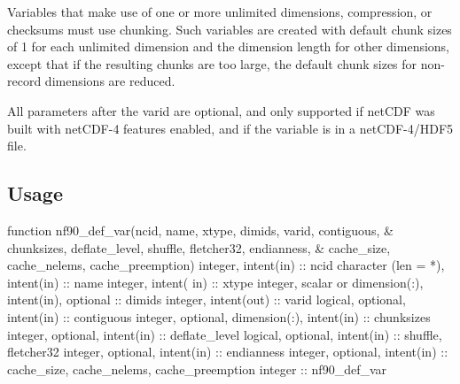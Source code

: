 Variables that make use of one or more unlimited dimensions, compression, or checksums must use chunking. Such variables are created with default chunk sizes of 1 for each unlimited dimension and the dimension length for other dimensions, except that if the resulting chunks are too large, the default chunk sizes for non-\/record dimensions are reduced.

All parameters after the varid are optional, and only supported if net\+C\+DF was built with net\+C\+D\+F-\/4 features enabled, and if the variable is in a net\+C\+D\+F-\/4/\+H\+D\+F5 file.

\subsection*{Usage}


\begin{DoxyCode}
\textcolor{keyword}{function }nf90\_def\_var(ncid, name, xtype, dimids, varid, contiguous, &
      chunksizes, deflate\_level, shuffle, fletcher32, endianness, &
      cache\_size, cache\_nelems, cache\_preemption)
  \textcolor{keywordtype}{integer}, \textcolor{keywordtype}{intent(in)} :: ncid
  \textcolor{keywordtype}{character (len = *)}, \textcolor{keywordtype}{intent(in)} :: name
  \textcolor{keywordtype}{integer}, \textcolor{keywordtype}{intent( in)} :: xtype
  \textcolor{keywordtype}{integer}, scalar or \textcolor{keywordtype}{dimension(:)}, \textcolor{keywordtype}{intent(in)}, \textcolor{keywordtype}{optional} :: dimids
  \textcolor{keywordtype}{integer}, \textcolor{keywordtype}{intent(out)} :: varid
  \textcolor{keywordtype}{logical}, \textcolor{keywordtype}{optional}, \textcolor{keywordtype}{intent(in)} :: contiguous
  \textcolor{keywordtype}{integer}, \textcolor{keywordtype}{optional}, \textcolor{keywordtype}{dimension(:)}, \textcolor{keywordtype}{intent(in)} :: chunksizes
  \textcolor{keywordtype}{integer}, \textcolor{keywordtype}{optional}, \textcolor{keywordtype}{intent(in)} :: deflate\_level
  \textcolor{keywordtype}{logical}, \textcolor{keywordtype}{optional}, \textcolor{keywordtype}{intent(in)} :: shuffle, fletcher32
  \textcolor{keywordtype}{integer}, \textcolor{keywordtype}{optional}, \textcolor{keywordtype}{intent(in)} :: endianness
   \textcolor{keywordtype}{integer}, \textcolor{keywordtype}{optional}, \textcolor{keywordtype}{intent(in)} :: cache\_size, cache\_nelems, cache\_preemption
  \textcolor{keywordtype}{integer}                                      :: nf90\_def\_var
\end{DoxyCode}


